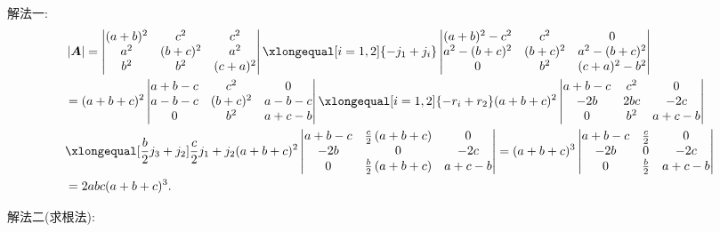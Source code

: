 \documentclass[lang=cn,newtx,10pt,scheme=chinese]{elegantbook}
\begin{document}
\begin{solution}
    {\color{blue}解法一:}
\begin{align*}
    &\left| \boldsymbol{A} \right|=\left| \begin{matrix}
        (a+b)^2&		c^2&		c^2\\
        a^2&		(b+c)^2&		a^2\\
        b^2&		b^2&		(c+a)^2\\
    \end{matrix} \right|\xlongequal[i=1,2]{-j_1+j_i}\left| \begin{matrix}
        (a+b)^2-c^2&		c^2&		0\\
        a^2-(b+c)^2&		(b+c)^2&		a^2-(b+c)^2\\
        0&		b^2&		(c+a)^2-b^2\\
    \end{matrix} \right|
    \\
    &=(a+b+c)^2\left| \begin{matrix}
        a+b-c&		c^2&		0\\
        a-b-c&		(b+c)^2&		a-b-c\\
        0&		b^2&		a+c-b\\
    \end{matrix} \right|\xlongequal[i=1,2]{-r_i+r_2}(a+b+c)^2\left| \begin{matrix}
        a+b-c&		c^2&		0\\
        -2b&		2bc&		-2c\\
        0&		b^2&		a+c-b\\
    \end{matrix} \right|
    \\
    &\xlongequal[\frac{b}{2}j_3+j_2]{\frac{c}{2}j_1+j_2}(a+b+c)^2\left| \begin{matrix}
        a+b-c&		\frac{c}{2}\left( a+b+c \right)&		0\\
        -2b&		0&		-2c\\
        0&		\frac{b}{2}\left( a+b+c \right)&		a+c-b\\
    \end{matrix} \right|=(a+b+c)^3\left| \begin{matrix}
        a+b-c&		\frac{c}{2}&		0\\
        -2b&		0&		-2c\\
        0&		\frac{b}{2}&		a+c-b\\
    \end{matrix} \right|
    \\
    &=2abc(a+b+c)^3.
\end{align*}

    {\color{blue}解法二(求根法):}
\end{solution}
\end{document}
